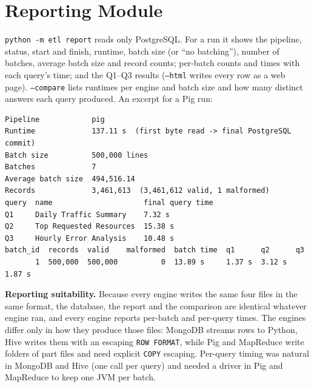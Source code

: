 \documentclass[conference]{IEEEtran}
\newcommand{\code}[1]{\texttt{\small #1}}
\begin{document}
\section{Reporting Module}
\code{python -m etl report} reads only PostgreSQL. For a run it shows the pipeline, status,
start and finish, runtime, batch size (or ``no batching''), number of batches, average batch size
and record counts; per-batch counts and times with each query's time; and the Q1--Q3 results
(\code{--html} writes every row as a web page). \code{--compare} lists runtimes per engine and batch
size and how many distinct answers each query produced. An excerpt for a Pig run:
\begin{lstlisting}[columns=fixed,basicstyle=\ttfamily\tiny]
Pipeline            pig
Runtime             137.11 s  (first byte read -> final PostgreSQL commit)
Batch size          500,000 lines
Batches             7
Average batch size  494,516.14
Records             3,461,613  (3,461,612 valid, 1 malformed)
query  name                     final query time
Q1     Daily Traffic Summary    7.32 s
Q2     Top Requested Resources  15.38 s
Q3     Hourly Error Analysis    10.48 s
batch_id  records  valid    malformed  batch time  q1      q2      q3
       1  500,000  500,000          0  13.89 s     1.37 s  3.12 s  1.87 s
\end{lstlisting}
\textbf{Reporting suitability.} Because every engine writes the same four files in the same
format, the database, the report and the comparison are identical whatever engine ran, and every
engine reports per-batch and per-query times. The engines differ only in how they produce those
files: MongoDB streams rows to Python, Hive writes them with an escaping \code{ROW FORMAT}, while Pig
and MapReduce write folders of part files and need explicit \code{COPY} escaping. Per-query timing
was natural in MongoDB and Hive (one call per query) and needed a driver in Pig and MapReduce to
keep one JVM per batch.
\end{document}
